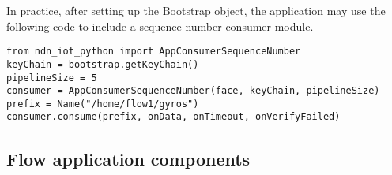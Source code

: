 In practice, after setting up the Bootstrap object, the application may use the following code to include a sequence number consumer module.

\begin{verbatim}
from ndn_iot_python import AppConsumerSequenceNumber
keyChain = bootstrap.getKeyChain()
pipelineSize = 5
consumer = AppConsumerSequenceNumber(face, keyChain, pipelineSize)
prefix = Name("/home/flow1/gyros")
consumer.consume(prefix, onData, onTimeout, onVerifyFailed)
\end{verbatim}

\subsection{Flow application components}

